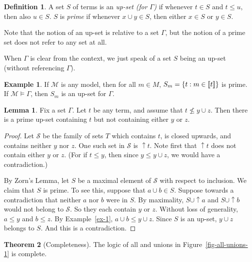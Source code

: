 \documentclass[12pt]{article}
\theoremstyle{definition}
\newtheorem{definition}{Definition}
\newtheorem{theorem}{Theorem}
\newtheorem{lemma}[theorem]{Lemma}
\newtheorem{example}{Example}
\newcommand{\semantics}[1]{[\![\mbox{\em $ #1 $\/}]\!]}
\newcommand{\Model}{\mathcal{M}}
\renewcommand{\SS}{\mathcal{S}}
\newcommand{\set}[1]{\{ #1 \}}
\begin{document}
\begin{definition} 
A set $S$ of terms is an \emph{up-set (for $\Gamma$)} if whenever $t\in S$ and $t\leq u$, then also $u\in S$.
$S$ is \emph{prime} if whenever $x\cup y \in S$, then either $x\in S$ or $y\in S$.
\end{definition}

Note that the notion of an up-set is relative to a set $\Gamma$, but the notion of a prime set does not refer to any set at all.

When $\Gamma$ is clear from the context, we just speak of a set $S$ being an up-set (without referencing $\Gamma$).

\begin{example}
If $\Model$ is any model, then for all $m\in M$, $S_m = \set{t : m \in \semantics{t}}$
is   prime.  If $\Model\models\Gamma$, then $S_m$ is an up-set for $\Gamma$.
\label{ex-3}
\end{example}

\begin{lemma}  Fix a set $\Gamma$.
Let $t$ be any term, and assume that $t \not\leq y\cup z$.
Then there is a prime up-set containing $t$ but not containing either $y$ or $z$.
\label{lemma-zorn}
\end{lemma}

\begin{proof}

Let $\SS$ be the family of sets $T$ which contains $t$, is closed upwards, and contains neither  $y$ nor $z$.
One such set in $\SS$ is $\uparrow t$.  Note first that $\uparrow t$ does not contain either $y$ or $z$.  (For if $t\leq y$, then since $y\leq y \cup z$, we would have a contradiction.)

By Zorn's Lemma, let $S$ be a maximal element of $\SS$ with respect to inclusion.
We claim that 
$S$ is  prime.   To see this, suppose that $a \cup b\in S$.  Suppose towards a contradiction that neither $a$ nor $b$ were in $S$.
By maximality, $S\cup\uparrow a$ and $S\cup\uparrow b$  would not belong to $\SS$. 
So they each contain $y$ or $z$.   Without loss of generality, $a\leq y$ and $b\leq z$.  
By Example~\ref{ex-1},  $a\cup b \leq y\cup z$.   Since $S$ is an up-set, $y\cup z$ belongs to $S$.    And this is a contradiction.
\end{proof}

\begin{theorem}[Completeness]
The logic of {\sf all} and unions in Figure~\ref{fig-all-unions-1} is complete.
\label{theorem-first-completeness-union}
\end{theorem}
\end{document}
